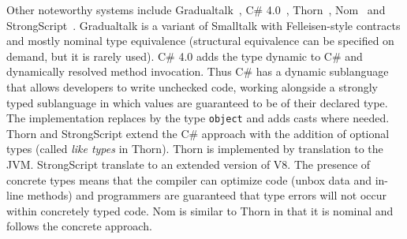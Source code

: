 \documentclass[USenglish]{tex/lipics-v2016}
\begin{document}
Other noteworthy systems include Gradualtalk~\cite{GS13}, C\#
4.0~\cite{Bierman10}, Thorn~\cite{oopsla09}, Nom~\cite{Muehlboeck2017} and
Strong\-Script~\cite{ecoop15}. Gradualtalk is a variant of Smalltalk with
Felleisen-style contracts and mostly nominal type equivalence (structural
equivalence can be specified on demand, but it is rarely
used). C\# 4.0 adds the type {\sf dynamic} to C\# and dynamically resolved
method invocation. Thus C\# has a dynamic sublanguage that allows developers
to write unchecked code, working alongside a strongly typed sublanguage in
which values are guaranteed to be of their declared type.  The
implementation replaces \any by the type {\tt object} and adds casts where
needed.  Thorn and StrongScript extend the C\# approach with the addition of
optional types (called {\em like types} in Thorn).  Thorn is implemented by
translation to the JVM. StrongScript translate to an extended version of
V8. The presence of concrete types means that the compiler can optimize code
(unbox data and in-line methods) and programmers are guaranteed that type
errors will not occur within concretely typed code. Nom is similar to Thorn
in that it is nominal and follows the concrete approach.

\newcommand{\rot}[1]{\rotatebox{80}{#1}\hspace{-10px}}
\newcommand{\X}{\EM{\bullet}}
\newcommand{\XX}{\EM{\bullet^{2}}}
\newcommand{\XY}{\EM{\bullet^{1}}}
\end{document}
